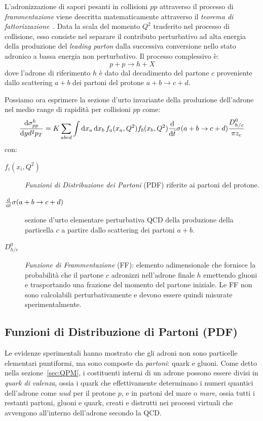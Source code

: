     L'adronizzazione di sapori pesanti in collisioni $pp$ attraverso il processo di \textit{frammentazione} viene descritta matematicamente attraverso il \textit{teorema di fattorizzazione}~\cite{CSS_2004}. Data la scala del momento $Q^2$ trasferito nel processo di collisione, esso consiste nel separare il contributo perturbativo ad alta energia della produzione del \textit{leading parton} dalla successiva conversione nello stato adronico a bassa energia non perturbativo. Il processo complessivo è:
    \begin{equation*}
        p + p \to h + X
    \end{equation*}
    dove l'adrone di riferimento $h$ è dato dal decadimento del partone $c$ proveniente dallo scattering $a + b$ dei partoni del protone $a + b \to c + d$.

    Possiamo ora esprimere la sezione d'urto invariante della produzione dell'adrone nel medio range di rapidità per collisioni $pp$ come:
    \begin{equation*}
        \dv{\sigma_{pp}^h}{y d^2 p_{T}} = K \sum_{abcd}{\int{\dd{x_a} \dd{x_b} f_{a}(x_a,Q^2) f_{b}(x_b,Q^2) \dv{\hat{t}} \sigma(a + b \to c + d) \frac{D_{{h}/{c}}^0}{\pi z_c}}}
    \end{equation*}
    con:
    \begin{description}
        \item[$f_i(x_i,Q^2)$] \textit{Funzioni di Distribuzione dei Partoni} (PDF) riferite ai partoni del protone.

        \item[$\dv{\hat{t}} \sigma(a + b \to c + d)$] sezione d'urto elementare perturbativa QCD della produzione della particella $c$ a partire dallo scattering dei partoni $a + b$.

        \item[$D_{{h}/{c}}^0$] \textit{Funzione di Frammentazione} (FF): elemento adimensionale che fornisce la probabilità che il partone $c$ adronizzi nell'adrone finale $h$ emettendo gluoni e trasportando una frazione del momento del partone iniziale. Le FF non sono calcolabili perturbativamente e devono essere quindi misurate sperimentalmente.
    \end{description}

    \subsection{Funzioni di Distribuzione di Partoni (PDF)}
    \label{sec:PDF}
        Le evidenze sperimentali hanno mostrato che gli adroni non sono particelle elementari puntiformi, ma sono composte da \textit{partoni}: quark e gluoni. Come detto nella sezione~\ref{sec:QPM}, i costituenti interni di un adrone possono essere divisi in \textit{quark di valenza}, ossia i quark che effettivamente determinano i numeri quantici dell'adrone come $uud$ per il protone $p$, e in partoni del mare o \textit{mare}, ossia tutti i restanti partoni, gluoni e quark, creati e distrutti nei processi virtuali che avvengono all'interno dell'adrone secondo la QCD.

